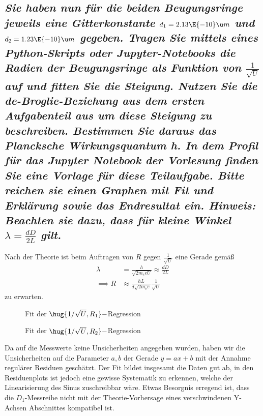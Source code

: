 \documentclass[ex, minted]{exercise_4.0}
\begin{document}
\subsection{\it Sie haben nun für die beiden Beugungsringe jeweils eine Gitterkonstante $d_1 = 2.13 \E{-10}\u m$ und $d_2 =
1.23 \E{-10}\u m$ gegeben. Tragen Sie mittels eines Python-Skripts oder Jupyter-Notebooks die Radien der
Beugungsringe als Funktion von $\frac1{\sqrt U}$ auf und fitten Sie die Steigung. Nutzen Sie die de-Broglie-Beziehung
aus dem ersten Aufgabenteil aus um diese Steigung zu beschreiben. Bestimmen Sie daraus das Plancksche
Wirkungsquantum h. In dem Profil für das Jupyter Notebook der Vorlesung finden Sie eine Vorlage für
diese Teilaufgabe. Bitte reichen sie einen Graphen mit Fit und Erklärung sowie das Endresultat ein.
Hinweis: Beachten sie dazu, dass für kleine Winkel $\lambda = \frac{d D}{
2L}$ gilt.}\vspace{2ex}

Nach der Theorie ist beim Auftragen von $R$ gegen $\frac1{\sqrt U}$ eine Gerade gemäß 
\begin{align*}
    \lambda &= \frac{h}{\sqrt{2m_e e U}} \approx \frac{dD}{2L}\\
    \implies R &\approx \frac{hL}{d\sqrt{2m_e e}} \frac1{\sqrt U}
\end{align*}
zu erwarten.


\begin{figure}[H]
    \centering
    
    \caption{Fit der $\hug{1/\sqrt U , R_1} -$Regression}
\end{figure}

\begin{figure}[H]
    \centering
    
    \caption{Fit der $\hug{1/\sqrt U , R_2} -$Regression}
\end{figure}

Da auf die Messwerte keine Unsicherheiten angegeben wurden, haben wir die Unsicherheiten auf die Parameter $a,b$ der Gerade $y=  ax+b$ mit der Annahme regulärer Residuen geschätzt. Der Fit bildet insgesamt die Daten gut ab, in den Residuenplots ist jedoch eine gewisse Systematik zu erkennen, welche der Linearisierung des Sinus zuschreibbar wäre. Etwas Besorgnis erregend ist, dass die $D_1$-Messreihe nicht mit der Theorie-Vorhersage eines verschwindenen Y-Achsen Abschnittes kompatibel ist.\\
\end{document}
